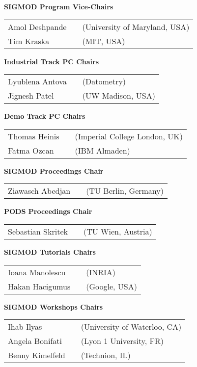 {\vfill
\textbf{SIGMOD Program Vice-Chairs}

\begin{tabular}{lp{.5em}l}
Amol Deshpande	&& \textsf{\small(University of Maryland, USA)}	\\
Tim Kraska	&& \textsf{\small(MIT, USA)}
\end{tabular}

\vfill
\textbf{Industrial Track PC Chairs}

\begin{tabular}{lp{.5em}l}
Lyublena Antova	&& \textsf{\small(Datometry)}	\\
Jignesh Patel	&& \textsf{\small(UW Madison, USA)}
\end{tabular}

\vfill
\textbf{Demo Track PC Chairs}

\begin{tabular}{lp{.5em}l}
Thomas Heinis	&& \textsf{\small(Imperial College London, UK)}	\\
Fatma Ozcan	&& \textsf{\small(IBM Almaden)}
\end{tabular}

\vfill
\textbf{SIGMOD Proceedings Chair}

\begin{tabular}{lp{.5em}l}
Ziawasch Abedjan	&& \textsf{\small(TU Berlin, Germany)}
\end{tabular}

\vfill
\textbf{PODS Proceedings Chair}

\begin{tabular}{lp{.5em}l}
Sebastian Skritek	&& \textsf{\small(TU Wien, Austria)}
\end{tabular}

\vfill
\textbf{SIGMOD Tutorials Chairs}

\begin{tabular}{lp{.5em}l}
Ioana Manolescu	&& \textsf{\small(INRIA)}	\\
Hakan Hacigumus	&& \textsf{\small(Google, USA)}
\end{tabular}

\vfill
\textbf{SIGMOD Workshops Chairs}

\begin{tabular}{lp{.5em}l}
Ihab Ilyas	&& \textsf{\small(University of Waterloo, CA)}	\\
Angela Bonifati	&& \textsf{\small(Lyon 1 University, FR)}	\\
Benny Kimelfeld	&& \textsf{\small(Technion, IL)}
\end{tabular}

}
